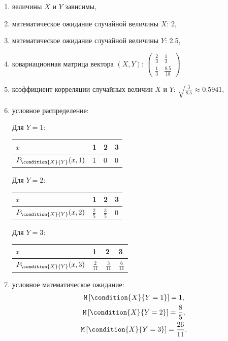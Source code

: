 \documentclass[12pt,a4paper]{article}
\begin{document}
\begin{enumerate}
        \item величины $X$ и $Y$ зависимы,
        \item математическое ожидание случайной величины $X$: 2,
        \item математическое ожидание случайной величины $Y$: 2.5,
        \item ковариационная матрица вектора $\left ( X, Y \right )$:
        $
        \begin{pmatrix}
            \frac{2}{3} & \frac{1}{3}    \\
            \frac{1}{3} & \frac{8.5}{18}
        \end{pmatrix}
        $

        \item коэффициент корреляции случайных величин $X$ и $Y$: $\sqrt{\frac{3}{8.5}} \approx 0.5941$,
        \item условное распределение:

        Для $Y=1$:

        \begin{tabular}{|p{3cm}|p{1cm}|p{1cm}|p{1cm}|}
            \hline
            $x$                          & 1 & 2 & 3 \\
            \hline
            $P_{\condition{X}{Y}}(x, 1)$ & 1 & 0 & 0 \\
            \hline
        \end{tabular}

        Для $Y=2$:

        \begin{tabular}{|p{3cm}|p{1cm}|p{1cm}|p{1cm}|}
            \hline
            $x$                          & 1             & 2             & 3 \\
            \hline
            $P_{\condition{X}{Y}}(x, 2)$ & $\frac{2}{5}$ & $\frac{3}{5}$ & 0 \\
            \hline
        \end{tabular}

        Для $Y=3$:

        \begin{tabular}{|p{3cm}|p{1cm}|p{1cm}|p{1cm}|}
            \hline
            $x$                          & 1              & 2              & 3              \\
            \hline
            $P_{\condition{X}{Y}}(x, 3)$ & $\frac{2}{11}$ & $\frac{3}{11}$ & $\frac{6}{11}$ \\
            \hline
        \end{tabular}

        \item условное математическое ожидание:
        \begin{gather*}
            \expectation{\condition{X}{Y=1}} = 1 , \\
            \expectation{\condition{X}{Y=2}} = \frac{8}{5} , \\
            \expectation{\condition{X}{Y=3}} = \frac{26}{11} .
        \end{gather*}
    \end{enumerate}
\end{document}

